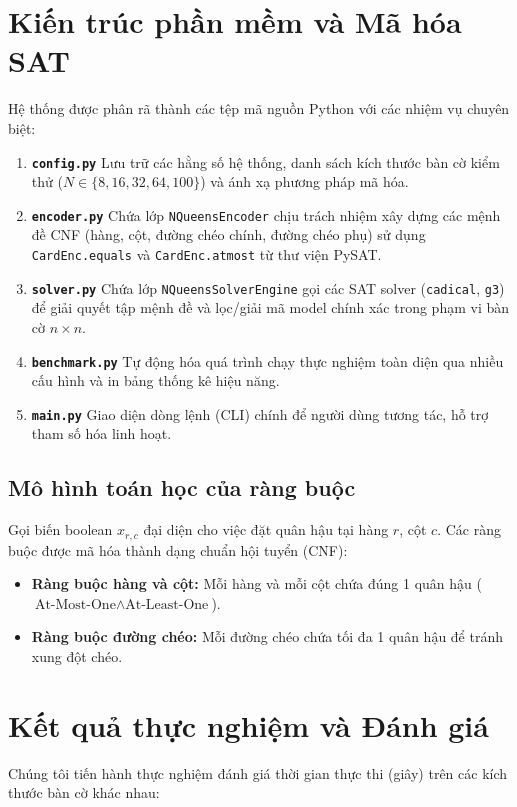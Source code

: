 \documentclass[a4paper,fleqn]{cas-sc}
\begin{document}
\section{Kiến trúc phần mềm và Mã hóa SAT}
Hệ thống được phân rã thành các tệp mã nguồn Python với các nhiệm vụ chuyên biệt:
\begin{enumerate}
    \item \textbf{\texttt{config.py}} Lưu trữ các hằng số hệ thống, danh sách kích thước bàn cờ kiểm thử ($N \in \{8, 16, 32, 64, 100\}$) và ánh xạ phương pháp mã hóa.
    \item \textbf{\texttt{encoder.py}} Chứa lớp \texttt{NQueensEncoder} chịu trách nhiệm xây dựng các mệnh đề CNF (hàng, cột, đường chéo chính, đường chéo phụ) sử dụng \texttt{CardEnc.equals} và \texttt{CardEnc.atmost} từ thư viện PySAT.
    \item \textbf{\texttt{solver.py}} Chứa lớp \texttt{NQueensSolverEngine} gọi các SAT solver (\texttt{cadical}, \texttt{g3}) để giải quyết tập mệnh đề và lọc/giải mã model chính xác trong phạm vi bàn cờ $n \times n$.
    \item \textbf{\texttt{benchmark.py}} Tự động hóa quá trình chạy thực nghiệm toàn diện qua nhiều cấu hình và in bảng thống kê hiệu năng.
    \item \textbf{\texttt{main.py}} Giao diện dòng lệnh (CLI) chính để người dùng tương tác, hỗ trợ tham số hóa linh hoạt.
\end{enumerate}

\subsection{Mô hình toán học của ràng buộc}
Gọi biến boolean $x_{r,c}$ đại diện cho việc đặt quân hậu tại hàng $r$, cột $c$. Các ràng buộc được mã hóa thành dạng chuẩn hội tuyển (CNF):
\begin{itemize}
    \item \textbf{Ràng buộc hàng và cột:} Mỗi hàng và mỗi cột chứa đúng 1 quân hậu ($\text{At-Most-One} \land \text{At-Least-One}$).
    \item \textbf{Ràng buộc đường chéo:} Mỗi đường chéo chứa tối đa 1 quân hậu để tránh xung đột chéo.
\end{itemize}

\section{Kết quả thực nghiệm và Đánh giá}
Chúng tôi tiến hành thực nghiệm đánh giá thời gian thực thi (giây) trên các kích thước bàn cờ khác nhau:
\end{document}
